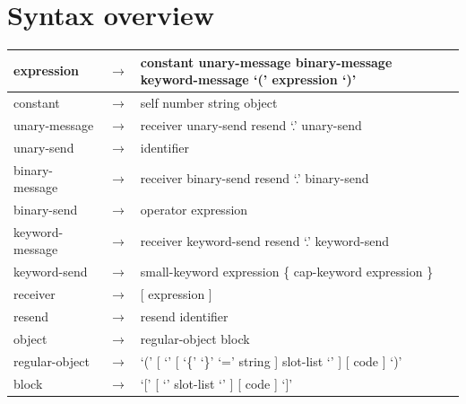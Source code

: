 \documentclass[letterpaper,10pt,english]{sphinxmanual}
\begin{document}
\section{Syntax overview}
\label{syntaxoverview:syntax-overview}\label{syntaxoverview::doc}
\begin{tabulary}{\linewidth}{|L|L|L|}
\hline

expression
 & 
\(\rightarrow\)
 & 
constant \textbar{} unary-message \textbar{} binary-message \textbar{} keyword-message \textbar{} ‘(’ expression ‘)’
\\\hline

constant
 & 
\(\rightarrow\)
 & 
self \textbar{} number \textbar{} string \textbar{} object
\\\hline

unary-message
 & 
\(\rightarrow\)
 & 
receiver unary-send \textbar{} resend ‘.’ unary-send
\\\hline

unary-send
 & 
\(\rightarrow\)
 & 
identifier
\\\hline

binary-message
 & 
\(\rightarrow\)
 & 
receiver binary-send \textbar{} resend ‘.’ binary-send
\\\hline

binary-send
 & 
\(\rightarrow\)
 & 
operator expression
\\\hline

keyword-message
 & 
\(\rightarrow\)
 & 
receiver keyword-send \textbar{} resend ‘.’ keyword-send
\\\hline

keyword-send
 & 
\(\rightarrow\)
 & 
small-keyword expression \{ cap-keyword expression \}
\\\hline

receiver
 & 
\(\rightarrow\)
 & 
{[} expression {]}
\\\hline

resend
 & 
\(\rightarrow\)
 & 
resend \textbar{} identifier
\\\hline

object
 & 
\(\rightarrow\)
 & 
regular-object \textbar{} block
\\\hline

regular-object
 & 
\(\rightarrow\)
 & 
‘(’ {[} ‘\textbar{}’ {[} ‘\{’ ‘\}’ ‘=’ string {]} slot-list ‘\textbar{}’ {]} {[} code {]} ‘)’
\\\hline

block
 & 
\(\rightarrow\)
 & 
‘{[}’ {[} ‘\textbar{}’ slot-list    ‘\textbar{}’ {]} {[} code {]} ‘{]}’
\\\hline


\end{tabulary}
\end{document}
